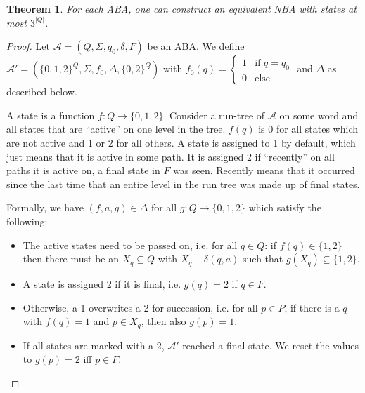 \documentclass{article}
\newtheorem{theorem}{Theorem}
\begin{document}
\vspace{1cm}
\begin{theorem}
\label{aba_to_nba}
	For each ABA, one can construct an equivalent NBA with states at most $3^{|Q|}$.
\end{theorem}
\begin{proof}
	Let $\mathcal{A} = (Q, \Sigma, q_0, \delta, F)$ be an ABA. We define $\mathcal{A}' = (\{0,1,2\}^Q, \Sigma, f_0, \Delta, \{0,2\}^Q)$ with $f_0(q) = \begin{cases} 1 & \text{if } q = q_0 \\ 0 & \text{else} \end{cases}$ and $\Delta$ as described below. 
	
	A state is a function $f : Q \rightarrow \{0, 1, 2\}$. Consider a run-tree of $\mathcal{A}$ on some word and all states that are ``active'' on one level in the tree. $f(q)$ is 0 for all states which are not active and 1 or 2 for all others. A state is assigned to 1 by default, which just means that it is active in some path. It is assigned 2 if ``recently'' on all paths it is active on, a final state in $F$ was seen. Recently means that it occurred since the last time that an entire level in the run tree was made up of final states.
	
	Formally, we have $(f, a, g) \in \Delta$ for all $g : Q \rightarrow \{0, 1, 2\}$ which satisfy the following:
	\begin{itemize}
		\item The active states need to be passed on, i.e. for all $q \in Q$: if $f(q) \in \{1,2\}$ then there must be an $X_q \subseteq Q$ with $X_q \models \delta(q, a)$ such that $g(X_q) \subseteq \{1,2\}$.
		\item A state is assigned 2 if it is final, i.e. $g(q) = 2$ if $q \in F$.
		\item Otherwise, a 1 overwrites a 2 for succession, i.e. for all $p \in P$, if there is a $q$ with $f(q) = 1$ and $p \in X_q$, then also $g(p) = 1$.
		\item If all states are marked with a 2, $\mathcal{A}'$ reached a final state. We reset the values to $g(p) = 2$ iff $p \in F$.
	\end{itemize}
\end{proof}



\newpage
\end{document}
